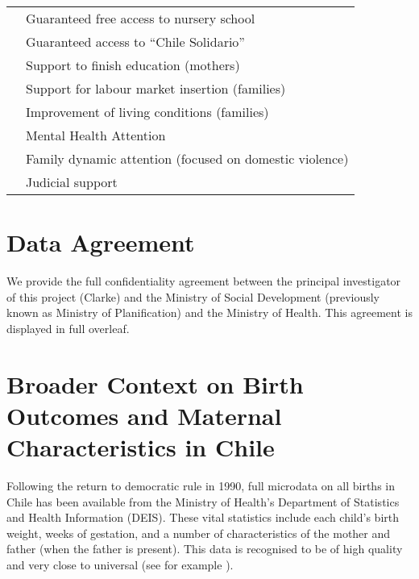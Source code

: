 \documentclass[12pt]{article}
\begin{document}
\begin{spacing}{1.4}
\begin{table}[htpb!]
\begin{tabular}{ll}
    & Guaranteed free access to nursery school \\
    & Guaranteed access to ``Chile Solidario''\\
    & Support to finish education (mothers) \\
    & Support for labour market insertion (families) \\
    & Improvement of living conditions (families) \\
    & Mental Health Attention \\
    & Family dynamic attention (focused on domestic violence)\\
    & Judicial support \\  \bottomrule
  \end{tabular}
\end{table}


\section{Data Agreement}
\label{app:agreement}
We provide the full confidentiality agreement between the principal investigator
of this project (Clarke) and the Ministry of Social Development (previously known
as Ministry of Planification) and the Ministry of Health.  This agreement is
displayed in full overleaf.
\\




\clearpage
\section{Broader Context on Birth Outcomes and Maternal Characteristics in Chile}
\label{app:context}
Following the return to democratic rule in 1990, full microdata on
all births in Chile has been available from the Ministry of Health's
Department of Statistics and Health Information (DEIS).  These
vital statistics include each child's birth weight, weeks of gestation,
and a number of characteristics of the mother and father (when the
father is present).  This data is recognised to be of high quality
and very close to universal (see for example \citet{Mikkelsenetal2015}).


\end{spacing}
\end{document}
